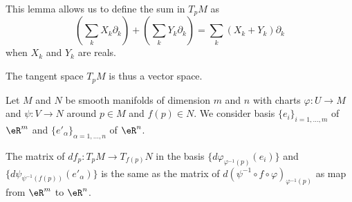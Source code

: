 This lemma allows us to define the sum in \( T_pM\) as      %
\begin{equation}
	\left( \sum_kX_k\partial_k \right)+\left( \sum_kY_k\partial_k \right)=\sum_k (X_k+Y_k)\partial_k
\end{equation}
when \( X_k\) and \( Y_k\) are reals.

The tangent space \( T_pM\) is thus a vector space.

\begin{lemma}       \label{LEMooVCSJooEuDZFz}
	Let \( M\) and \( N\) be smooth manifolds of dimension \( m\) and \( n\) with charts \( \varphi\colon U\to M\) and \( \psi\colon V\to N\) around \( p\in M\) and \( f(p)\in N\). We consider basis \( \{ e_i \}_{i=1,\ldots, m}\) of \( \eR^m\) and \( \{ e'_{\alpha} \}_{\alpha=1,\ldots, n}\) of \( \eR^n\).

	The matrix of \( df_p\colon T_pM\to T_{f(p)}N\) in the basis \( \{ d\varphi_{\varphi^{-1}(p)}(e_i) \}\) and \( \{ d\psi_{\psi^{-1}(f(p))}(e'_{\alpha}) \}\) is the same as the matrix of \( d(\psi^{-1}\circ f\circ\varphi)_{\varphi^{-1}(p)}\) as map from \( \eR^m\) to \( \eR^n\).
\end{lemma}

